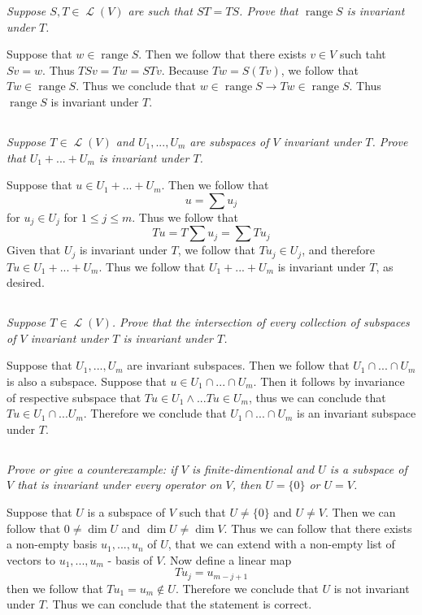 \documentclass[11pt,oneside,titlepage]{book}
\DeclareMathOperator \map {\mathcal {L}}
\DeclareMathOperator \range {range}
\begin{document}
\textit{Suppose $S, T \in \map(V)$ are such that $ST = TS$. Prove that $\range S$ is invariant under
  $T$.}

Suppose that $w \in \range S$. Then we follow that there exists $v \in V$ such taht
$Sv = w$. Thus $TSv = Tw = STv$. Because $Tw = S(Tv)$, we follow that $Tw \in \range S$. Thus
we conclude that $w \in \range S \to Tw \in \range S$. Thus $\range S$ is invariant under $T$.

\subsection{}

\textit{Suppose $T \in \map(V)$ and $U_1, ..., U_m$ are subspaces of $V$ invariant under $T$.
  Prove that $U_1 + ... + U_m$ is invariant under $T$.}

Suppose that $u \in U_1 + ... + U_m$. Then we follow that
$$u = \sum{u_j}$$
for $u_j \in U_j$ for $1 \leq j \leq m$. Thus we follow that 
$$T u = T \sum{u_j} = \sum{T u_j}$$
Given that $U_j$ is invariant under $T$, we follow that $T u_j \in U_j$, and therefore
$Tu \in U_1 + ... + U_m$. Thus we follow that $U_1 + ... + U_m$ is invariant under $T$, as desired.


\subsection{}

\textit{Suppose $T \in \map(V)$. Prove that the intersection of every collection of subspaces
  of $V$ invariant under $T$ is invariant under $T$.}

Suppose that $U_1, ..., U_m$ are invariant subspaces. Then we follow that $U_1 \cap ... \cap U_m$
is also a subspace. Suppose that $u \in U_1 \cap ... \cap U_m$. Then it follows by
invariance of respective subspace that $Tu \in U_1 \land ... Tu \in U_m$, thus we can
conclude that $Tu \in U_1 \cap ... U_m$. Therefore we conclude that $U_1 \cap ... \cap U_m$ is
an invariant subspace under $T$.


\subsection{}

\textit{Prove or give a counterexample: if $V$ is finite-dimentional and $U$ is a subspace of $V$
  that is invariant under every operator on $V$, then $U = \{0\}$ or $U = V$.}

Suppose that  $U$ is a subspace of $V$ such that $U \neq \{0\}$ and $U \neq V$. Then we
can follow that $0 \neq \dim U$ and $\dim U \neq \dim V$. Thus we can follow that
there exists a non-empty basis $u_1, ..., u_n$ of $U$, that we can extend with a non-empty
list of vectors to $u_1, ..., u_m$ - basis of $V$. Now define a linear map
$$Tu_j = u_{m - j + 1}$$
then we follow that $T u_1 = u_m \notin U$. Therefore we conclude that $U$ is not invariant
under $T$. Thus we can conclude that the statement is correct.
\end{document}
